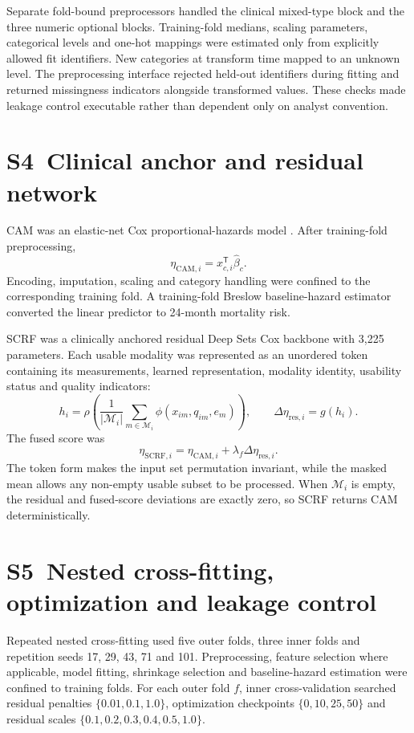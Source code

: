 \documentclass[pdflatex,sn-nature]{sn-jnl}
\begin{document}
Separate fold-bound preprocessors handled the clinical mixed-type block and the three numeric optional blocks. Training-fold medians, scaling parameters, categorical levels and one-hot mappings were estimated only from explicitly allowed fit identifiers. New categories at transform time mapped to an unknown level. The preprocessing interface rejected held-out identifiers during fitting and returned missingness indicators alongside transformed values. These checks made leakage control executable rather than dependent only on analyst convention.

\section*{S4~Clinical anchor and residual network}
CAM was an elastic-net Cox proportional-hazards model \cite{cox1972,breslow1974}. After training-fold preprocessing,
\begin{equation}
\eta_{\mathrm{CAM},i}=x_{c,i}^{\mathsf T}\hat\beta_c.
\end{equation}
Encoding, imputation, scaling and category handling were confined to the corresponding training fold. A training-fold Breslow baseline-hazard estimator converted the linear predictor to 24-month mortality risk.

SCRF was a clinically anchored residual Deep Sets Cox backbone with 3,225 parameters. Each usable modality was represented as an unordered token containing its measurements, learned representation, modality identity, usability status and quality indicators:
\begin{equation}
h_i=\rho\left(\frac{1}{|\mathcal{M}_i|}\sum_{m\in\mathcal{M}_i}\phi(x_{im},q_{im},e_m)\right),\qquad
\Delta\eta_{\mathrm{res},i}=g(h_i).
\end{equation}
The fused score was
\begin{equation}
\eta_{\mathrm{SCRF},i}=\eta_{\mathrm{CAM},i}+\lambda_f\Delta\eta_{\mathrm{res},i}.
\end{equation}
The token form makes the input set permutation invariant, while the masked mean allows any non-empty usable subset to be processed. When $\mathcal{M}_i$ is empty, the residual and fused-score deviations are exactly zero, so SCRF returns CAM deterministically.

\section*{S5~Nested cross-fitting, optimization and leakage control}
Repeated nested cross-fitting used five outer folds, three inner folds and repetition seeds 17, 29, 43, 71 and 101. Preprocessing, feature selection where applicable, model fitting, shrinkage selection and baseline-hazard estimation were confined to training folds. For each outer fold $f$, inner cross-validation searched residual penalties $\{0.01,0.1,1.0\}$, optimization checkpoints $\{0,10,25,50\}$ and residual scales $\{0.1,0.2,0.3,0.4,0.5,1.0\}$.
\end{document}
